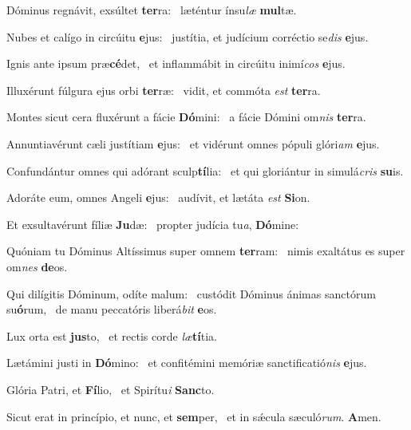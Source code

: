 \item Dóminus regnávit, exsúltet \textbf{ter}ra:~\psstar{} læténtur ínsu\textit{læ} \textbf{mul}tæ.
\item Nubes et calígo in circúitu \textbf{e}jus:~\psstar{} justítia, et judícium corréctio se\textit{dis} \textbf{e}jus.
\item Ignis ante ipsum præ\textbf{cé}det,~\psstar{} et inflammábit in circúitu inimí\textit{cos} \textbf{e}jus.
\item Illuxérunt fúlgura ejus orbi \textbf{ter}ræ:~\psstar{} vidit, et commóta \textit{est} \textbf{ter}ra.
\item Montes sicut cera fluxérunt a fácie \textbf{Dó}mini:~\psstar{} a fácie Dómini om\textit{nis} \textbf{ter}ra.
\item Annuntiavérunt cæli justítiam \textbf{e}jus:~\psstar{} et vidérunt omnes pópuli glóri\textit{am} \textbf{e}jus.
\item Confundántur omnes qui adórant sculp\textbf{tí}lia:~\psstar{} et qui gloriántur in simulá\textit{cris} \textbf{su}is.
\item Adoráte eum, omnes Angeli \textbf{e}jus:~\psstar{} audívit, et lætáta \textit{est} \textbf{Si}on.
\item Et exsultavérunt fíliæ \textbf{Ju}dæ:~\psstar{} propter judícia tu\textit{a}, \textbf{Dó}mine:
\item Quóniam tu Dóminus Altíssimus super omnem \textbf{ter}ram:~\psstar{} nimis exaltátus es super om\textit{nes} \textbf{de}os.
\item Qui dilígitis Dóminum, odíte malum:~\pscross{} custódit Dóminus ánimas sanctórum su\textbf{ó}rum,~\psstar{} de manu peccatóris liberá\textit{bit} \textbf{e}os.
\item Lux orta est \textbf{jus}to,~\psstar{} et rectis corde \textit{læ}\textbf{tí}tia.
\item Lætámini justi in \textbf{Dó}mino:~\psstar{} et confitémini memóriæ sanctificatió\textit{nis} \textbf{e}jus.
\item Glória Patri, et \textbf{Fí}lio,~\psstar{} et Spirítu\textit{i} \textbf{Sanc}to.
\item Sicut erat in princípio, et nunc, et \textbf{sem}per,~\psstar{} et in sǽcula sæculó\textit{rum}. \textbf{A}men.
